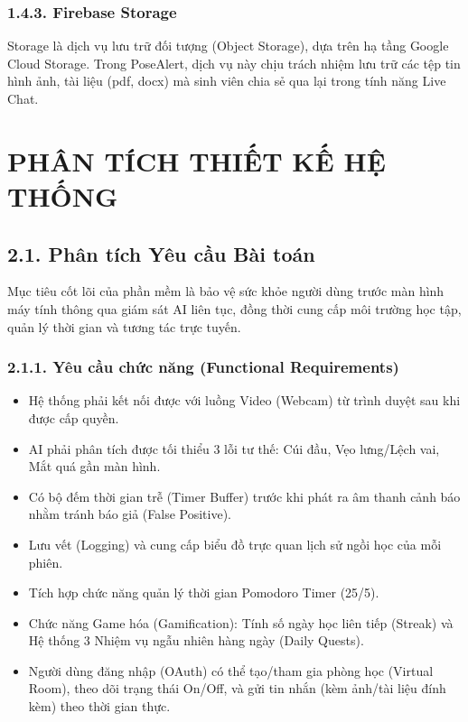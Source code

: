 \documentclass[12pt,a4paper]{report}
\begin{document}
\subsection{1.4.3. Firebase Storage}
Storage là dịch vụ lưu trữ đối tượng (Object Storage), dựa trên hạ tầng Google Cloud Storage. Trong PoseAlert, dịch vụ này chịu trách nhiệm lưu trữ các tệp tin hình ảnh, tài liệu (pdf, docx) mà sinh viên chia sẻ qua lại trong tính năng Live Chat.


\chapter{PHÂN TÍCH THIẾT KẾ HỆ THỐNG}

\section{2.1. Phân tích Yêu cầu Bài toán}
Mục tiêu cốt lõi của phần mềm là bảo vệ sức khỏe người dùng trước màn hình máy tính thông qua giám sát AI liên tục, đồng thời cung cấp môi trường học tập, quản lý thời gian và tương tác trực tuyến.

\subsection{2.1.1. Yêu cầu chức năng (Functional Requirements)}
\begin{itemize}
    \item Hệ thống phải kết nối được với luồng Video (Webcam) từ trình duyệt sau khi được cấp quyền.
    \item AI phải phân tích được tối thiểu 3 lỗi tư thế: Cúi đầu, Vẹo lưng/Lệch vai, Mắt quá gần màn hình.
    \item Có bộ đếm thời gian trễ (Timer Buffer) trước khi phát ra âm thanh cảnh báo nhằm tránh báo giả (False Positive).
    \item Lưu vết (Logging) và cung cấp biểu đồ trực quan lịch sử ngồi học của mỗi phiên.
    \item Tích hợp chức năng quản lý thời gian Pomodoro Timer (25/5).
    \item Chức năng Game hóa (Gamification): Tính số ngày học liên tiếp (Streak) và Hệ thống 3 Nhiệm vụ ngẫu nhiên hàng ngày (Daily Quests).
    \item Người dùng đăng nhập (OAuth) có thể tạo/tham gia phòng học (Virtual Room), theo dõi trạng thái On/Off, và gửi tin nhắn (kèm ảnh/tài liệu đính kèm) theo thời gian thực.
\end{itemize}
\end{document}
